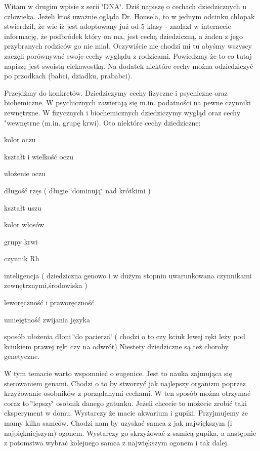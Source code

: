 Witam w drugim wpisie z serii \char`\"{}\-D\-N\-A\char`\"{}. Dziś napiszę o cechach dziedzicznych u człowieka. Jeżeli ktoś uważnie ogląda Dr. House'a, to w jednym odcinku chłopak stwierdził, że wie iż jest adoptowany już od 5 klasy -\/ znalazł w internecie informację, że podbródek który on ma, jest cechą dziedziczną, a żaden z jego przybranych rodziców go nie miał. Oczywiście nie chodzi mi tu abyśmy wszyscy zaczęli porównywać swoje cechy wyglądu z rodzicami. Powiedzmy że to co tutaj napiszę jest swoistą ciekawostką. Na dodatek niektóre cechy można odziedziczyć po przodkach (babci, dziadku, prababci).

Przejdźmy do konkretów. Dziedziczymy cechy fizyczne i psychiczne oraz biohemiczne. W psychicznych zawierają się m.\-in. podatności na pewne czynniki zewnętrzne. W fizycznych i biochemicznych dziedziczymy wygląd oraz cechy "wewnętrne (m.\-in. grupę krwi). Oto niektóre cechy dziedziczne\-:


\begin{DoxyItemize}
\item kolor oczu
\item kształt i wielkość oczu
\item ułożenie oczu
\item długość rzęs ( długie \char`\"{}dominują\char`\"{} nad krótkimi )
\item kształt uszu
\item kolor włosów
\item grupy krwi
\item czynnik Rh
\item inteligencja ( dziedziczna genowo i w dużym stopniu uwarunkowana czynnikami zewnętrznymi,środowiska )
\item leworęczność i praworęczność
\item umiejętność zwijania języka
\item sposób ułożenia dłoni \char`\"{}do pacierza\char`\"{} ( chodzi o to czy kciuk lewej ręki leży pod kciukiem prawej ręki czy na odwrót) Niestety dziedziczne są też choroby genetyczne.
\end{DoxyItemize}

W tym temacie warto wspomnieć o eugenice. Jest to nauka zajmująca się sterowaniem genami. Chodzi o to by stworzyć jak najlepszy organizm poprzez krzyżowanie osobników z porządanymi cechami. W ten sposób można otrzymać coraz to \char`\"{}lepszy\char`\"{} osobnik danego gatunku. Jeżeli chcecie to możecie zrobić taki eksperyment w domu. Wystarczy że macie akwarium i gupiki. Przyjmujemy że mamy kilka samców. Chodzi nam by uzyskać samca z jak największym (i najpiękniejszym) ogonem. Wystarczy go skrzyżować z samicą gupika, a następnie z potomstwa wybrać kolejnego samca z największym ogonem i tak dalej.

